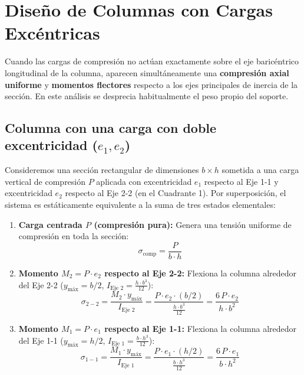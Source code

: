 \section{Diseño de Columnas con Cargas Excéntricas}

Cuando las cargas de compresión no actúan exactamente sobre el eje baricéntrico longitudinal de la columna, aparecen simultáneamente una \textbf{compresión axial uniforme} y \textbf{momentos flectores} respecto a los ejes principales de inercia de la sección. En este análisis se desprecia habitualmente el peso propio del soporte.

\subsection{Columna con una carga con doble excentricidad ($e_1, e_2$)}

Consideremos una sección rectangular de dimensiones $b \times h$ sometida a una carga vertical de compresión $P$ aplicada con excentricidad $e_1$ respecto al Eje 1-1 y excentricidad $e_2$ respecto al Eje 2-2 (en el Cuadrante 1). Por superposición, el sistema es estáticamente equivalente a la suma de tres estados elementales:
\begin{enumerate}
    \item \textbf{Carga centrada $P$ (compresión pura):} Genera una tensión uniforme de compresión en toda la sección:
          \begin{equation*}
              \sigma_{\text{comp}} = \frac{P}{b \cdot h}
          \end{equation*}
    \item \textbf{Momento $M_2 = P\cdot e_2$ respecto al Eje 2-2:} Flexiona la columna alrededor del Eje 2-2 ($y_{\text{máx}} = b/2$, $I_{\text{Eje 2}} = \frac{h\cdot b^3}{12}$):
          \begin{equation*}
              \sigma_{2-2} = \frac{M_2 \cdot y_{\text{máx}}}{I_{\text{Eje 2}}} = \frac{P \cdot e_2 \cdot (b/2)}{\frac{h\cdot b^3}{12}} = \frac{6\,P\cdot e_2}{h\cdot b^2}
          \end{equation*}
    \item \textbf{Momento $M_1 = P\cdot e_1$ respecto al Eje 1-1:} Flexiona la columna alrededor del Eje 1-1 ($y_{\text{máx}} = h/2$, $I_{\text{Eje 1}} = \frac{b\cdot h^3}{12}$):
          \begin{equation*}
              \sigma_{1-1} = \frac{M_1 \cdot y_{\text{máx}}}{I_{\text{Eje 1}}} = \frac{P \cdot e_1 \cdot (h/2)}{\frac{b\cdot h^3}{12}} = \frac{6\,P\cdot e_1}{b\cdot h^2}
          \end{equation*}
\end{enumerate}


